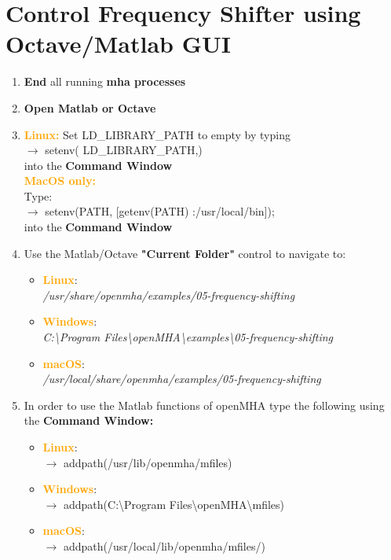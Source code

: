 \documentclass[11pt,a4paper,twoside]{article}
\newcommand{\+}{\discretionary{\mbox{\scriptsize$\hookleftarrow$}}{}{}}
\begin{document}
{{\section{Control Frequency Shifter using Octave/Matlab GUI}
\label{sec:freqshifter}


\begin{enumerate}
\item \textbf{End} all running \textbf{mha processes} 
\item \textbf{Open Matlab or Octave} 
\item \textcolor{orange}{\textbf{Linux:}} Set LD\_LIBRARY\_PATH to empty by typing \\ {\ttfamily
  $\rightarrow$ setenv(\textquotesingle
  LD\_LIBRARY\_PATH\textquotesingle,\textquotesingle\textquotesingle)} \\
  into the \textbf{Command Window} \\
\textcolor{orange}{\textbf{MacOS only:}} \\Type: \\{\ttfamily $\rightarrow$ setenv(\textquotesingle PATH\textquotesingle, [getenv(\textquotesingle PATH\textquotesingle) \textquotesingle :/usr/local/bin\textquotesingle]);} \\
into the \textbf{Command Window} \\  
\item Use the Matlab/Octave \textbf{"Current Folder"} control to navigate to:

\begin{itemize}
\item \textcolor{orange}{\textbf{Linux}}: \\
  \textit{/usr/share/openmha/examples/05-frequency-shifting}
\item \textcolor{orange}{\textbf{Windows}}: \\
  \textit{C:\textbackslash Program Files\textbackslash openMHA\textbackslash examples\textbackslash 05-frequency-shifting}
\item \textcolor{orange}{\textbf{macOS}}: \\
  \textit{/usr/local/share/openmha/examples/05-frequency-shifting}
\end{itemize}

\item In order to use the Matlab functions of openMHA type the following using the \textbf{Command Window:} 

\begin{itemize}
\item \textcolor{orange}{\textbf{Linux}}: \\ $\rightarrow$
  {\ttfamily addpath(\textquotesingle{}/usr/lib/openmha/mfiles\textquotesingle{})}
\item \textcolor{orange}{\textbf{Windows}}: \\ $\rightarrow$
  {\ttfamily addpath(\textquotesingle{}C:\textbackslash Program Files\textbackslash openMHA\textbackslash mfiles\textquotesingle{})}
\item \textcolor{orange}{\textbf{macOS}}: \\ $\rightarrow$
  {\ttfamily addpath(\textquotesingle{}/usr/local/lib/openmha/mfiles/\textquotesingle{})}
\end{itemize}



\end{enumerate}}}
\end{document}
